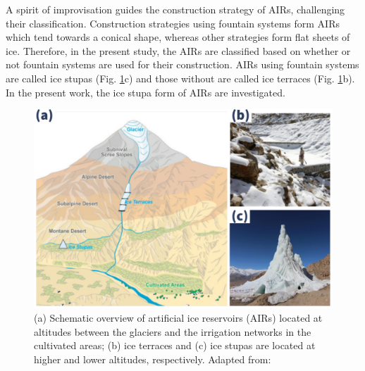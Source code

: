 \documentclass[tc, manuscript]{copernicus}
\begin{document}
A spirit of improvisation guides the construction strategy of AIRs, challenging their classification.
Construction strategies using fountain systems form AIRs which tend towards a conical shape, whereas other
strategies form flat sheets of ice. Therefore, in the present study, the AIRs are classified based on whether or
not fountain systems are used for their construction. AIRs using fountain systems are called ice stupas (Fig.
\ref{fig:AIRforms}c) and those without are called ice terraces (Fig. \ref{fig:AIRforms}b). In the present work,
the ice stupa form of AIRs are investigated.

\begin{figure}[htb]
\includegraphics[width=12cm]{Figures/AIR_forms.jpg}

\caption{ (a) Schematic overview of artificial ice reservoirs (AIRs) located at
altitudes between the glaciers and the irrigation networks in the cultivated areas; (b) ice terraces and (c) ice
stupas are located at higher and lower altitudes, respectively. Adapted from:
\cite{nusserLocalKnowledgeGlobal2016}}

\label{fig:AIRforms}
\end{figure}
\end{document}
